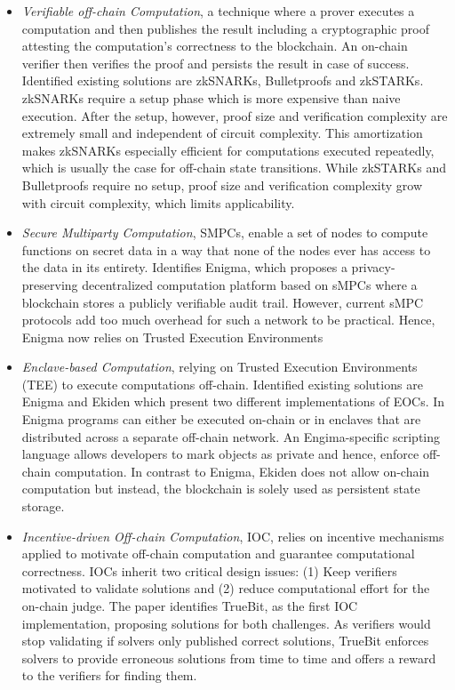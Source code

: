 \begin{itemize}
\item \textit{Verifiable off-chain Computation}, a technique where a prover executes a computation and then publishes the result including a cryptographic proof attesting the computation’s correctness to the blockchain. An on-chain verifier then verifies the proof and persists the result in case of success. Identified existing solutions are zkSNARKs, Bulletproofs and zkSTARKs. zkSNARKs require a setup phase which is more expensive than naive execution. After the setup, however, proof size and verification complexity are extremely small and independent of circuit complexity. This amortization makes zkSNARKs especially efficient for computations executed repeatedly, which is usually the case for off-chain state transitions. While zkSTARKs and Bulletproofs require no setup, proof size and verification complexity grow with circuit complexity, which limits applicability.
\item \textit{Secure Multiparty Computation}, SMPCs, enable a set of nodes to compute functions on secret data in a way that none of the nodes ever has access to the data in its entirety. Identifies Enigma, which proposes a privacy-preserving decentralized computation platform based on sMPCs where a blockchain stores a publicly verifiable audit trail. However, current sMPC protocols add too much overhead for such a network to be practical. Hence, Enigma now relies on Trusted Execution Environments
\item \textit{Enclave-based Computation}, relying on Trusted Execution Environments (TEE) to execute computations off-chain. Identified existing solutions are Enigma and Ekiden which present two different implementations of EOCs. In Enigma programs can either be executed on-chain or in enclaves that are distributed across a separate off-chain network. An Engima-specific scripting language allows developers to mark objects as private and hence, enforce off-chain computation. In contrast to Enigma, Ekiden does not allow on-chain computation but instead, the blockchain is solely used as persistent state storage.
\item \textit{Incentive-driven Off-chain Computation}, IOC, relies on incentive mechanisms applied to motivate off-chain computation and guarantee computational correctness. IOCs inherit two critical design issues: (1) Keep verifiers motivated to validate solutions and (2) reduce computational effort for the on-chain judge. The paper identifies TrueBit, as the first IOC implementation, proposing solutions for both challenges. As verifiers would stop validating if solvers only published correct solutions, TrueBit enforces solvers to provide erroneous solutions from time to time and offers a reward to the verifiers for finding them.
\end{itemize}



